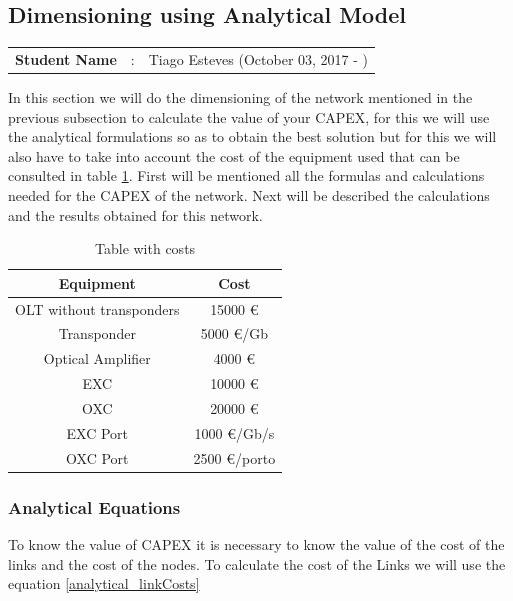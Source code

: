 \subsection{Dimensioning using Analytical Model}
\begin{tcolorbox}	
\begin{tabular}{p{2.75cm} p{0.2cm} p{10.5cm}} 	
\textbf{Student Name}  &:& Tiago Esteves    (October 03, 2017 - )\\
\end{tabular}
\end{tcolorbox}

In this section we will do the dimensioning of the network mentioned in the previous subsection to calculate the value of your CAPEX, for this we will use the analytical formulations so as to obtain the best solution but for this we will also have to take into account the cost of the equipment used that can be consulted in table \ref{table_cost_opaque}.
First will be mentioned all the formulas and calculations needed for the CAPEX of the network. Next will be described the calculations and the results obtained for this network.\\

\begin{table}[h!]
\centering
\begin{tabular}{|| c | c||}
 \hline
 Equipment & Cost \\
 \hline\hline
 OLT without transponders & 15000 \euro \\
 Transponder & 5000 \euro/Gb \\
 Optical Amplifier & 4000 \euro \\
 EXC & 10000 \euro \\
 OXC & 20000 \euro \\
 EXC Port & 1000 \euro /Gb/s\\
 OXC Port & 2500 \euro /porto \\
 \hline
\end{tabular}
\caption{Table with costs}
\label{table_cost_opaque}
\end{table}


\subsubsection{Analytical Equations}

To know the value of CAPEX it is necessary to know the value of the cost of the links and the cost of the nodes.
To calculate the cost of the Links we will use the equation \ref{analytical_linkCosts}

